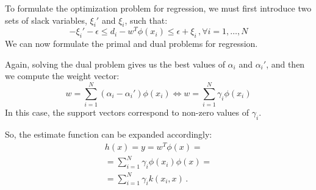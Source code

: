 To formulate the optimization problem for regression, we must first introduce two sets of slack variables, $\xi_i'$ and $\xi_i$, such that:
\begin{equation*}
    -\xi_i' - \epsilon \leq d_i - w^T\phi(x_i) \leq \epsilon + \xi_i \,, \forall i = 1, \dots , N
\end{equation*}
We can now formulate the primal and dual problems for regression.



Again, solving the dual problem gives us the best values of $\alpha_i$ and $\alpha_i'$, and then we compute the weight vector:
\begin{equation*}
    w = \sum_{i=1}^N (\alpha_i - \alpha_i')\phi(x_i) \iff w = \sum_{i=1}^N \gamma_i \phi(x_i)
\end{equation*}
In this case, the support vectors correspond to non-zero values of $\gamma_i$.

So, the estimate function can be expanded accordingly:
\begin{align*}
    h(x) = y = w^T \phi(x) = \\
    = \sum_{i=1}^N \gamma_i \phi(x_i) \phi(x) = \\
    = \sum_{i=1}^N \gamma_i k(x_i,x) \,.
\end{align*}


